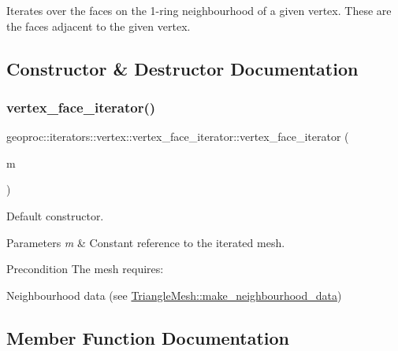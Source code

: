 Iterates over the faces on the 1-\/ring neighbourhood of a given vertex. These are the faces adjacent to the given vertex. 

\subsection{Constructor \& Destructor Documentation}
\mbox{\label{classgeoproc_1_1iterators_1_1vertex_1_1vertex__face__iterator_ad45cd64b9e5a3321ac6344984c7cf564}} 
\subsubsection{\texorpdfstring{vertex\+\_\+face\+\_\+iterator()}{vertex\_face\_iterator()}}
{\footnotesize\ttfamily geoproc\+::iterators\+::vertex\+::vertex\+\_\+face\+\_\+iterator\+::vertex\+\_\+face\+\_\+iterator (\begin{DoxyParamCaption}\item[{const \hyperlink{classgeoproc_1_1TriangleMesh}{Triangle\+Mesh} \&}]{m }\end{DoxyParamCaption})}



Default constructor. 


\begin{DoxyParams}{Parameters}
{\em m} & Constant reference to the iterated mesh. \\
\hline
\end{DoxyParams}
\begin{DoxyPrecond}{Precondition}
The mesh requires\+:
\begin{DoxyItemize}
\item Neighbourhood data (see \hyperlink{classgeoproc_1_1TriangleMesh_a84003dfdfd5e591c00f01a797578ff1f}{Triangle\+Mesh\+::make\+\_\+neighbourhood\+\_\+data}) 
\end{DoxyItemize}
\end{DoxyPrecond}


\subsection{Member Function Documentation}
\mbox{\label{classgeoproc_1_1iterators_1_1vertex_1_1vertex__face__iterator_aa75fe423e210cf4e20e721307c80f6fb}} 
